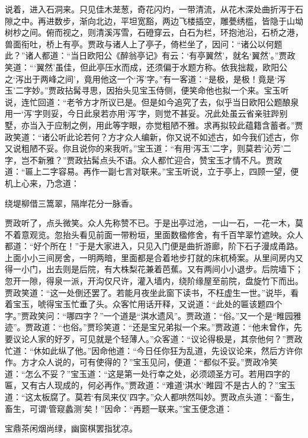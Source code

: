 \documentclass[12pt,oneside]{book}
\begin{document}
说着，进入石洞来。只见佳木茏葱，奇花闪灼，一带清流，从花木深处曲折泻于石隙之中。再进数步，渐向北边，平坦宽豁，两边飞楼插空，雕甍绣槛，皆隐于山坳树杪之间。俯而视之，则清溪泻雪，石磴穿云，白石为栏，环抱池沿，石桥之港，兽面衔吐，桥上有亭。贾政与诸人上了亭子，倚栏坐了，因问：“诸公以何题此？”诸人都道：“当日欧阳公《醉翁亭记》有云：‘有亭翼然’，就名‘翼然’。”贾政笑道：“‘翼然’虽佳，但此亭压水而成，还须偏于水题方称。依我拙裁，欧阳公之‘泻出于两峰之间’，竟用他这一个‘泻’字。”有一客道：“是极，是极！竟是‘泻玉’二字妙。”贾政拈髯寻思，因抬头见宝玉侍侧，便笑命他也拟一个来。宝玉听说，连忙回道：“老爷方才所议已是。但是如今追究了去，似乎当日欧阳公题酿泉用一‘泻’字则妥，今日此泉若亦用‘泻’字，则觉不甚妥。况此处虽云省亲驻跸别墅，亦当入于应制之例，用此等字眼，亦觉粗陋不雅。求再拟较此蕴籍含蓄者。”贾政笑道：“诸公听此论若何？方才众人编新，你又说不如述古，如今我们述古，你又说粗陋不妥。你且说你的来我听。”宝玉道：“有用‘泻玉’二字，则莫若‘沁芳’二字，岂不新雅？”贾政拈髯点头不语。众人都忙迎合，赞宝玉才情不凡。贾政道：“匾上二字容易。再作一副七言对联来。”宝玉听说，立于亭上，四顾一望，便机上心来，乃念道：

绕堤柳借三篙翠，隔岸花分一脉香。

贾政听了，点头微笑。众人先称赞不已。于是出亭过池，一山一石，一花一木，莫不着意观览。忽抬头看见前面一带粉垣，里面数楹修舍，有千百竿翠竹遮映。众人都道：“好个所在！”于是大家进入，只见入门便是曲折游廊，阶下石子漫成甬路。上面小小三间房舍，一明两暗，里面都是合着地步打就的床杌椅案。从里间房内又得一小门，出去则是后院，有大株梨花兼着芭蕉。又有两间小小退步。后院墙下；忽开一隙，得泉一派，开沟仅尺许，灌入墙内，绕阶缘屋至前院，盘旋竹下而出。
贾政笑道：“这一处倒还罢了。若能月夜坐此窗下读书，不枉虚生一世。”说毕，看着宝玉，唬得宝玉忙垂了头。众客忙用话开释，又说道：“此处的匾该题四个字。”贾政笑问：“哪四字？”一个道是“淇水遗风”。贾政道：“俗。”又一个是“睢园雅迹”。贾政道：“也俗。”贾珍笑道：“还是宝兄弟拟一个来。”贾政道：“他未曾作，先要议论人家的好歹，可见就是个轻薄人。”众客道：“议论得极是，其奈他何？”贾政忙道：“休如此纵了他。”因命他道：“今日任你狂为乱道，先设议论来，然后方许你作。方才众人说的，可有使得的？”宝玉见问，便道：“都似不妥。”贾政冷笑道：“怎么不妥？”宝玉道：“这是第一处行幸之处，必须颂圣方可。若用四字的匾，又有古人现成的，何必再作。”贾政道：“难道‘淇水’‘睢园’不是古人的？”宝玉道：“这太板腐了。莫若‘有凤来仪’四字。”众人都哄然叫妙。贾政点头道：“畜生，畜生，可谓‘管窥蠡测’矣！”因命：“再题一联来。”宝玉便念道：

宝鼎茶闲烟尚绿，幽窗棋罢指犹凉。
\end{document}
